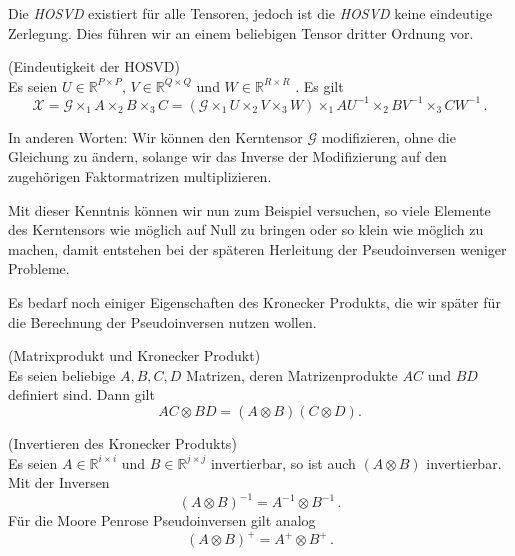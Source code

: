 Die \textit{HOSVD} existiert für alle Tensoren, jedoch ist die \textit{HOSVD} keine eindeutige Zerlegung. Dies führen wir an einem beliebigen Tensor dritter Ordnung vor.

\begin{Beispiel} (Eindeutigkeit der HOSVD) \\
Es seien $U \in \mathbb{R}^{P \times P}$, $V \in \mathbb{R}^{Q \times Q}$  und $W \in \mathbb{R}^{R \times R}$ . Es gilt
\begin{equation}
{\pmb{\mathscr{X}}} = {\pmb{\mathscr{G}}} \times_1 A \times_2 B \times_3 C = ({\pmb{\mathscr{G}}} \times_1 U \times_2 V \times_3 W) \times_1 AU^{-1} \times_2 BV^{-1} \times_3 CW^{-1} \, .
\end{equation}
\end{Beispiel}

In anderen Worten: Wir können den Kerntensor ${\pmb{\mathscr{G}}}$ modifizieren, ohne die Gleichung zu ändern, solange wir das Inverse der Modifizierung auf den zugehörigen Faktormatrizen multiplizieren.

Mit dieser Kenntnis können wir nun zum Beispiel versuchen, so viele Elemente des Kerntensors wie möglich auf Null zu bringen oder so klein wie möglich zu machen, damit entstehen bei der späteren Herleitung der Pseudoinversen weniger Probleme.

Es bedarf noch einiger Eigenschaften des Kronecker Produkts, die wir später für die Berechnung der Pseudoinversen nutzen wollen.

\begin{Lemma} (Matrixprodukt und Kronecker Produkt) \label{lemma:prod} \\
Es seien beliebige $A,B,C,D$ Matrizen, deren Matrizenprodukte $AC$ und $BD$ definiert sind. Dann gilt
\begin{equation*}
AC \otimes BD = (A \otimes B)(C \otimes D).
\end{equation*}
\end{Lemma}

\begin{Lemma} (Invertieren des Kronecker Produkts) \\ \label{lemma:inverse}
Es seien $A \in \mathbb{R}^{i \times i}$ und $B \in \mathbb{R}^{j \times j}$ invertierbar, so ist auch $(A \otimes B)$ invertierbar. Mit der Inversen
\begin{equation*}
(A \otimes B)^{-1} = A^{-1} \otimes B^{-1} \, . 
\end{equation*}
Für die Moore Penrose Pseudoinversen gilt analog
\begin{equation*}
(A \otimes B)^{+} = A^{+} \otimes B^{+} \, .
\end{equation*}
\end{Lemma}


